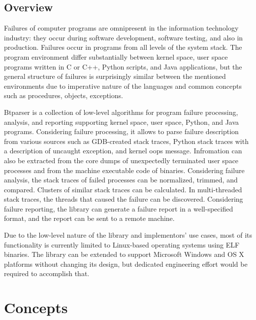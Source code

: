 \documentclass[a4paper]{book}
\title{Btparser\\
\vskip 1em
\large{A program failure analysis library}}
\author{Karel Klíč}
\begin{document}
\maketitle

\tableofcontents

\cleardoublepage

\chapter{Overview}

Failures of computer programs are omnipresent in the information
technology industry: they occur during software development, software
testing, and also in production.  Failures occur in programs from all
levels of the system stack.  The program environment differ
substantially between kernel space, user space programs written in C
or C++, Python scripts, and Java applications, but the general
structure of failures is surprisingly similar between the mentioned
environments due to imperative nature of the languages and common
concepts such as procedures, objects, exceptions.

Btparser is a collection of low-level algorithms for program failure
processing, analysis, and reporting supporting kernel space, user
space, Python, and Java programs.  Considering failure processing, it
allows to parse failure description from various sources such as
GDB-created stack traces, Python stack traces with a description of
uncaught exception, and kernel oops message.  Infromation can also be
extracted from the core dumps of unexpectedly terminated user space
processes and from the machine executable code of binaries.
Considering failure analysis, the stack traces of failed processes can
be normalized, trimmed, and compared.  Clusters of similar stack
traces can be calculated.  In multi-threaded stack traces, the threads
that caused the failure can be discovered.  Considering failure
reporting, the library can generate a failure report in a
well-specified format, and the report can be sent to a remote machine.

Due to the low-level nature of the library and implementors' use
cases, most of its functionality is currently limited to Linux-based
operating systems using ELF binaries.  The library can be extended to
support Microsoft Windows and OS X platforms without changing its
design, but dedicated engineering effort would be required to
accomplish that.

\part{Concepts}
\end{document}
